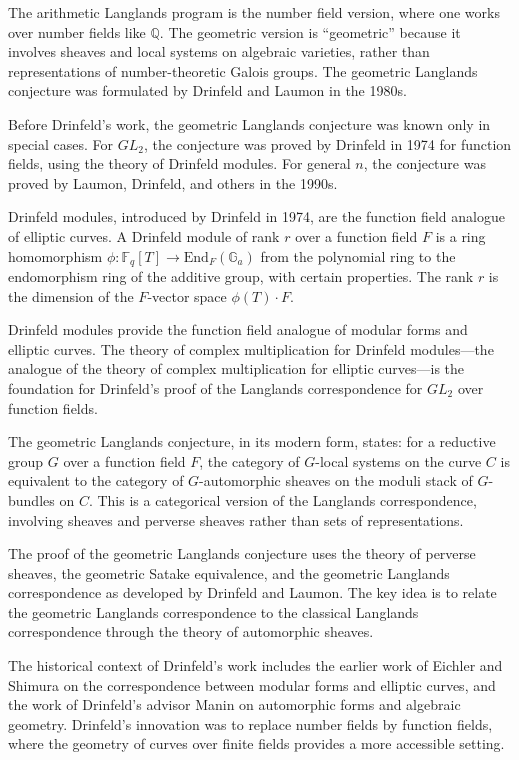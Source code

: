 The arithmetic Langlands program is the number field version, where one works over number fields like $\mathbb{Q}$. The geometric version is ``geometric'' because it involves sheaves and local systems on algebraic varieties, rather than representations of number-theoretic Galois groups. The geometric Langlands conjecture was formulated by Drinfeld and Laumon in the 1980s.

Before Drinfeld's work, the geometric Langlands conjecture was known only in special cases. For $GL_2$, the conjecture was proved by Drinfeld in 1974 for function fields, using the theory of Drinfeld modules. For general $n$, the conjecture was proved by Laumon, Drinfeld, and others in the 1990s.

Drinfeld modules, introduced by Drinfeld in 1974, are the function field analogue of elliptic curves. A Drinfeld module of rank $r$ over a function field $F$ is a ring homomorphism $\phi: \mathbb{F}_q[T] \to \text{End}_F(\mathbb{G}_a)$ from the polynomial ring to the endomorphism ring of the additive group, with certain properties. The rank $r$ is the dimension of the $F$-vector space $\phi(T) \cdot F$.

Drinfeld modules provide the function field analogue of modular forms and elliptic curves. The theory of complex multiplication for Drinfeld modules---the analogue of the theory of complex multiplication for elliptic curves---is the foundation for Drinfeld's proof of the Langlands correspondence for $GL_2$ over function fields.

The geometric Langlands conjecture, in its modern form, states: for a reductive group $G$ over a function field $F$, the category of $G$-local systems on the curve $C$ is equivalent to the category of $G$-automorphic sheaves on the moduli stack of $G$-bundles on $C$. This is a categorical version of the Langlands correspondence, involving sheaves and perverse sheaves rather than sets of representations.

The proof of the geometric Langlands conjecture uses the theory of perverse sheaves, the geometric Satake equivalence, and the geometric Langlands correspondence as developed by Drinfeld and Laumon. The key idea is to relate the geometric Langlands correspondence to the classical Langlands correspondence through the theory of automorphic sheaves.

The historical context of Drinfeld's work includes the earlier work of Eichler and Shimura on the correspondence between modular forms and elliptic curves, and the work of Drinfeld's advisor Manin on automorphic forms and algebraic geometry. Drinfeld's innovation was to replace number fields by function fields, where the geometry of curves over finite fields provides a more accessible setting.

